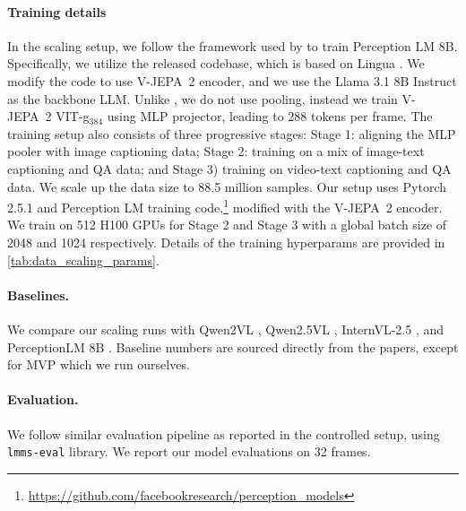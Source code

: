 \documentclass[]{fairmeta}
\newcommand{\model}{V-JEPA~2\xspace}
\begin{document}
\paragraph{\bf Training details} 
In the scaling setup, we follow the framework used by \citet{cho2025perceptionlm} to train Perception LM 8B. Specifically, we utilize the released codebase, which is based on Lingua \citep{meta_lingua}. We modify the code to use \model encoder, and we use the Llama 3.1 8B Instruct \citep{grattafiori2024llama} as the backbone LLM. Unlike \citet{cho2025perceptionlm}, we do not use pooling, instead we train \model VIT-g$_{384}$ using MLP projector, leading to 288 tokens per frame. The training setup also consists of three progressive stages: Stage 1: aligning the MLP pooler with image captioning data; Stage 2: training on a mix of image-text captioning and QA data; and Stage 3) training on video-text captioning and QA data.
We scale up the data size to 88.5 million samples.
Our setup uses Pytorch 2.5.1 and Perception LM training code,\footnote{\href{https://github.com/facebookresearch/perception_models/tree/main}{https://github.com/facebookresearch/perception\_models}} modified with the \model encoder. We train on 512 H100 GPUs for Stage 2 and Stage 3 with a global batch size of 2048 and 1024 respectively. Details of the training hyperparams are provided in \autoref{tab:data_scaling_params}.

\paragraph{\bf Baselines.}
We compare our scaling runs with Qwen2VL \citep{wang2024qwen2}, Qwen2.5VL \citep{bai2025qwen2}, InternVL-2.5 \citep{chen2024expanding}, and PerceptionLM 8B \citep{cho2025perceptionlm}. Baseline numbers are sourced directly from the papers, except for MVP which we run ourselves.

\paragraph{\bf Evaluation.}
We follow similar evaluation pipeline as reported in the controlled setup, using \texttt{lmms-eval} library. 
We report our model evaluations on 32 frames.
\end{document}
